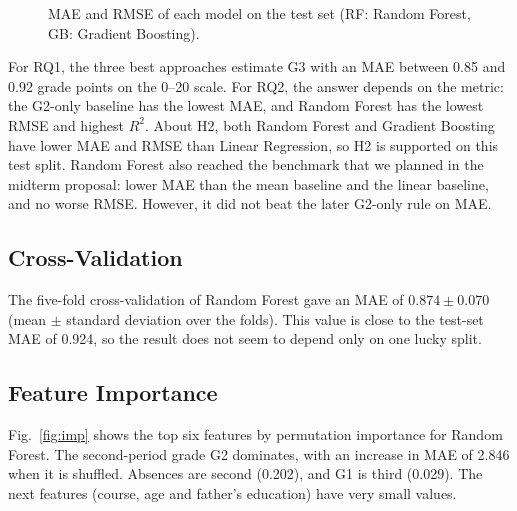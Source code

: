 \documentclass[10pt,twocolumn,a4paper]{article}
\newcommand{\Gthree}{G3}
\newcommand{\Gtwo}{G2}
\newcommand{\Gone}{G1}
\begin{document}
\begin{figure}[t]
\centering
{}
\caption{MAE and RMSE of each model on the test set (RF: Random Forest, GB: Gradient Boosting).}
\label{fig:errors}
\end{figure}

For RQ1, the three best approaches estimate \Gthree{} with an MAE between 0.85 and 0.92 grade points on the 0--20 scale. For RQ2, the answer depends on the metric: the G2-only baseline has the lowest MAE, and Random Forest has the lowest RMSE and highest $R^2$. About H2, both Random Forest and Gradient Boosting have lower MAE and RMSE than Linear Regression, so H2 is supported on this test split. Random Forest also reached the benchmark that we planned in the midterm proposal: lower MAE than the mean baseline and the linear baseline, and no worse RMSE. However, it did not beat the later G2-only rule on MAE.

\subsection{Cross-Validation}
The five-fold cross-validation of Random Forest gave an MAE of $0.874 \pm 0.070$ (mean $\pm$ standard deviation over the folds). This value is close to the test-set MAE of 0.924, so the result does not seem to depend only on one lucky split.

\subsection{Feature Importance}
Fig.~\ref{fig:imp} shows the top six features by permutation importance for Random Forest. The second-period grade \Gtwo{} dominates, with an increase in MAE of 2.846 when it is shuffled. Absences are second (0.202), and \Gone{} is third (0.029). The next features (course, age and father's education) have very small values.
\end{document}
